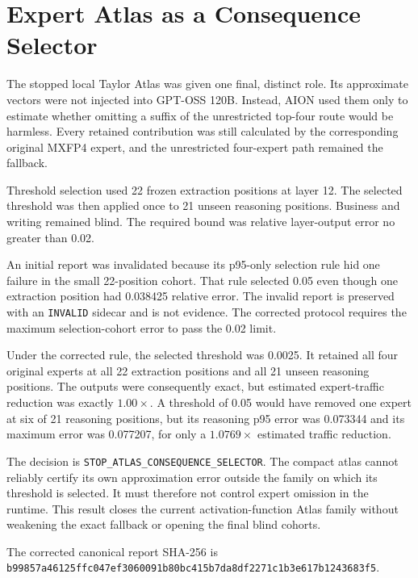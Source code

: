 \section{Expert Atlas as a Consequence Selector}
\label{sec:gptoss120b-atlas-consequence-selector}

The stopped local Taylor Atlas was given one final, distinct role.  Its
approximate vectors were not injected into GPT-OSS 120B.  Instead, AION used
them only to estimate whether omitting a suffix of the unrestricted top-four
route would be harmless.  Every retained contribution was still calculated by
the corresponding original MXFP4 expert, and the unrestricted four-expert path
remained the fallback.

Threshold selection used 22 frozen extraction positions at layer 12.  The
selected threshold was then applied once to 21 unseen reasoning positions.
Business and writing remained blind.  The required bound was relative
layer-output error no greater than 0.02.

An initial report was invalidated because its p95-only selection rule hid one
failure in the small 22-position cohort.  That rule selected 0.05 even though
one extraction position had 0.038425 relative error.  The invalid report is
preserved with an \texttt{INVALID} sidecar and is not evidence.  The corrected
protocol requires the maximum selection-cohort error to pass the 0.02 limit.

Under the corrected rule, the selected threshold was 0.0025.  It retained all
four original experts at all 22 extraction positions and all 21 unseen
reasoning positions.  The outputs were consequently exact, but estimated
expert-traffic reduction was exactly $1.00\times$.  A threshold of 0.05 would
have removed one expert at six of 21 reasoning positions, but its reasoning
p95 error was 0.073344 and its maximum error was 0.077207, for only a
$1.0769\times$ estimated traffic reduction.

The decision is \texttt{STOP\_ATLAS\_CONSEQUENCE\_SELECTOR}.  The compact atlas
cannot reliably certify its own approximation error outside the family on
which its threshold is selected.  It must therefore not control expert
omission in the runtime.  This result closes the current activation-function
Atlas family without weakening the exact fallback or opening the final blind
cohorts.

The corrected canonical report SHA-256 is
\texttt{b99857a46125ffc047ef3060091b80bc415b7da8df2271c1b3e617b1243683f5}.

